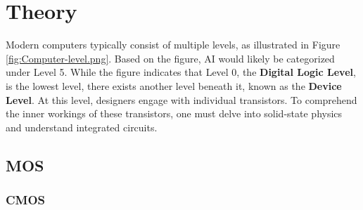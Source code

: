 \section{Theory}

Modern computers typically consist of multiple levels\cite[Page 2]{tanenbaum_2012_structured}, as illustrated in Figure \ref{fig:Computer-level.png}. Based on the figure, AI would likely be categorized under Level 5. While the figure indicates that Level 0, the \textbf{Digital Logic Level}, is the lowest level, there exists another level beneath it, known as the \textbf{Device Level}. At this level, designers engage with individual transistors. To comprehend the inner workings of these transistors, one must delve into solid-state physics and understand integrated circuits.
\subsection{MOS}
\subsubsection{CMOS}

